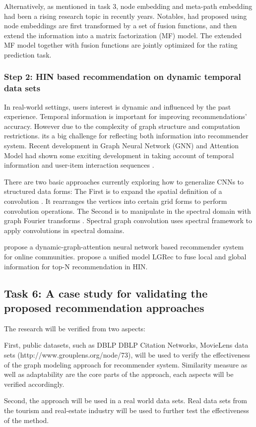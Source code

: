 Alternatively, as mentioned in task 3, node embedding and meta-path embedding had been a rising research topic in recently years. Notables, \citet{shi2018heterogeneous} had proposed using node embeddings are first transformed by a set of fusion functions, and then extend the information into a matrix factorization (MF) model. The extended MF model together with fusion functions are jointly optimized for the rating prediction task.

\subsubsection*{Step 2: HIN based recommendation on dynamic temporal data sets}

In real-world settings, users interest is dynamic and influenced by the past experience. Temporal information is important for improving recommendations' accuracy. However due to the complexity of graph structure and computation restrictions. its a big challenge for reflecting both information into recommender system. Recent development in Graph Neural Network (GNN) and Attention Model had shown some exciting development in taking account of temporal information and user-item interaction sequences \citep{yu2017spatio}.  

There are two basic approaches currently exploring how to generalize CNNs to structured data forms: 
The First is to expand the spatial definition of a convolution \citep{niepert2016learning}. It rearranges the vertices into certain grid forms to perform convolution operations. The Second is to manipulate in the spectral domain with graph Fourier transforms \citep{bruna2013spectral}. Spectral graph convolution uses spectral framework to apply convolutions in spectral domains.

\citet{song2019session} propose a dynamic-graph-attention neural network based recommender system for online communities. \citet{Hu2018recommender} propose a unified model LGRec to fuse local and global information for top-N recommendation in HIN.


\subsection{Task 6:  A case study for validating the proposed recommendation approaches}

The research will be verified from two aspects: 

First, public datasets, such as DBLP DBLP Citation Networks, MovieLens data sets (http://www.grouplens.org/node/73), will be used to verify the effectiveness of the graph modeling approach for recommender system. Similarity measure as well as adaptability are the core parts of the approach, each aspects will be verified accordingly. 

Second, the approach will be used in a real world data sets. Real data sets from the tourism and real-estate industry will be used to further test the effectiveness of the method.

